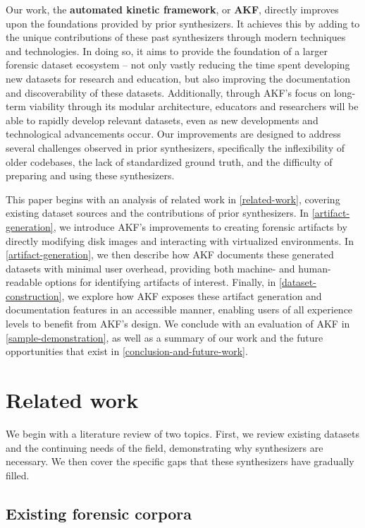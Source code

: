 \documentclass[final,5p,times,twocolumn]{elsarticle}
\begin{document}
Our work, the \textbf{automated kinetic framework}, or \textbf{AKF},
directly improves upon the foundations provided by prior synthesizers.
It achieves this by adding to the unique contributions of these past
synthesizers through modern techniques and technologies. In doing so, it
aims to provide the foundation of a larger forensic dataset ecosystem --
not only vastly reducing the time spent developing new datasets for
research and education, but also improving the documentation and
discoverability of these datasets. Additionally, through AKF's focus on
long-term viability through its modular architecture, educators and
researchers will be able to rapidly develop relevant datasets, even as
new developments and technological advancements occur. Our improvements
are designed to address several challenges observed in prior
synthesizers, specifically the inflexibility of older codebases, the
lack of standardized ground truth, and the difficulty of preparing and
using these synthesizers.

This paper begins with an analysis of related work in \autoref{related-work}, covering existing dataset sources and the contributions of prior
synthesizers. In \autoref{artifact-generation}, we introduce AKF's
improvements to creating forensic artifacts by directly modifying disk
images and interacting with virtualized environments. In
\autoref{artifact-generation}, we then describe how AKF documents these
generated datasets with minimal user overhead, providing both machine-
and human-readable options for identifying artifacts of interest.
Finally, in \autoref{dataset-construction}, we explore how AKF exposes
these artifact generation and documentation features in an accessible
manner, enabling users of all experience levels to benefit from AKF's
design. We conclude with an evaluation of AKF in \autoref{sample-demonstration}, as well as a summary of our work and the future
opportunities that exist in \autoref{conclusion-and-future-work}.

\section{Related work}\label{related-work}

We begin with a literature review of two topics. First, we review
existing datasets and the continuing needs of the field, demonstrating
why synthesizers are necessary. We then cover the specific gaps that
these synthesizers have gradually filled.

\subsection{Existing forensic corpora}\label{existing-forensic-corpora}
\end{document}
